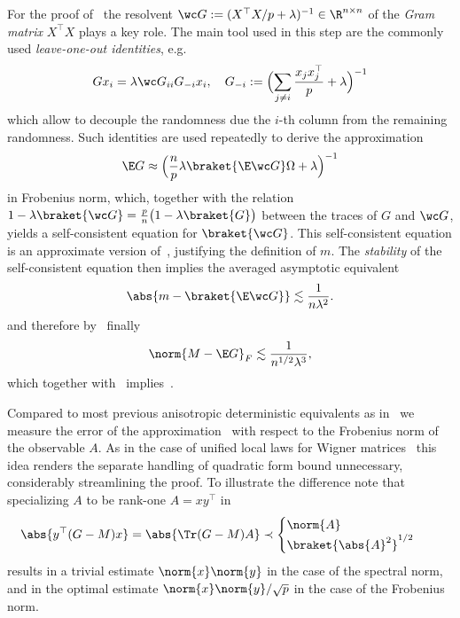 \begin{description}
\begin{remark}
        \end{remark}        
        For the proof of~ the resolvent $\wc G:=(X^\top X/p+\lambda)^{-1}\in\R^{n\times n}$ of the \emph{Gram matrix} $X^\top X$ plays a key role. The main tool used in this step are the commonly used \emph{leave-one-out identities}, e.g.
        \begin{equation}\label{Gx loo}
            Gx_i=\lambda\wc G_{ii} G_{-i}x_i, \quad G_{-i}:=\Bigl(\sum_{j\ne i}\frac{x_jx_j^\top}{p} + \lambda \Bigr)^{-1}
        \end{equation}
        which allow to decouple the randomness due the $i$-th column from the remaining randomness. 
        Such identities are used repeatedly to derive the approximation
        \begin{equation}\label{EG approx MG}
            \E G \approx \Bigl(\frac{n}{p}\lambda \braket{\E \wc G}\Omega + \lambda\Bigr)^{-1}
        \end{equation}
        in Frobenius norm, which, together with the relation $1-\lambda\braket{\wc G}=\frac{p}{n}\bigl(1-\lambda\braket{G}\bigr)$ between the traces of $G$ and $\wc G$, yields a self-consistent equation
        for $\braket{\wc G}$. This self-consistent equation is an approximate version of~, justifying the definition of $m$. The \emph{stability} of the self-consistent equation then implies the averaged asymptotic equivalent
        \begin{equation}
            \abs{m-\braket{\E\wc G}}\lesssim\frac{1}{n\lambda^2}.
        \end{equation}
        and therefore by~ finally
        \begin{equation}
            \norm{M-\E G}_F \lesssim \frac{1}{n^{1/2}\lambda^3},
        \end{equation}
        which together with~ implies~.

        Compared to most previous anisotropic deterministic equivalents as in~\cite{10.1007/s00440-016-0730-4} we measure the error of the approximation~ with respect to the Frobenius norm of the observable $A$. As in the case of unified local laws for Wigner matrices~\cite{2203.01861} this idea renders the separate handling of quadratic form bound unnecessary, considerably streamlining the proof. To illustrate the difference note that specializing $A$ to be rank-one $A=xy^\top$ in
        \[
            \begin{split}
                \abs{y^\top(G-M)x}=\abs{\Tr(G-M)A}&\prec \begin{cases}\norm{A} \\ \braket{\abs{A}^2}^{1/2}
                \end{cases}
            \end{split}
        \]
        results in a trivial estimate $\norm{x}\norm{y}$ in the case of the spectral norm, and in the optimal estimate $\norm{x}\norm{y}/\sqrt{p}$ in the case of the Frobenius norm.


\end{description}
